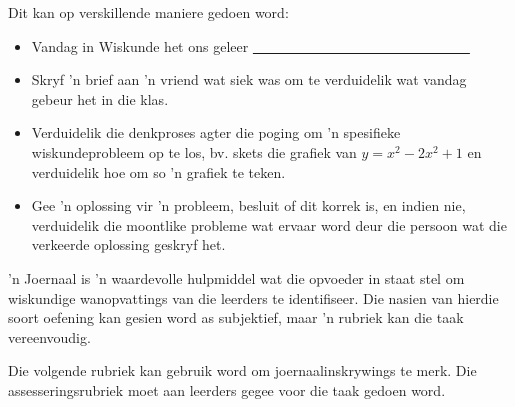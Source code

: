 Dit kan op verskillende maniere gedoen word:
\begin{itemize}[noitemsep]
\item
  Vandag in Wiskunde het ons geleer \underline{~~~~~~~~~~~~~~~~~~~~~~~~~~~~~~~} 
\item
Skryf 'n brief aan 'n vriend wat siek was om te verduidelik wat vandag gebeur het in die klas.
\item
  Verduidelik die denkproses agter die poging om 'n spesifieke wiskundeprobleem op te los, bv. skets die grafiek van $y = x^2 - 2x^2 + 1$ en verduidelik hoe om so 'n grafiek te teken.
\item
   Gee 'n oplossing vir 'n probleem, besluit of dit korrek is, en indien nie, verduidelik die moontlike probleme wat ervaar word deur die persoon wat die verkeerde oplossing geskryf het.
\end{itemize}
'n Joernaal is 'n waardevolle hulpmiddel wat die opvoeder in staat stel om wiskundige wanopvattings van die leerders te identifiseer. Die nasien van hierdie soort oefening kan gesien word as subjektief, maar 'n rubriek kan die taak vereenvoudig. \par

Die volgende rubriek kan gebruik word om joernaalinskrywings te merk. Die assesseringsrubriek moet aan leerders gegee voor die taak gedoen word.



